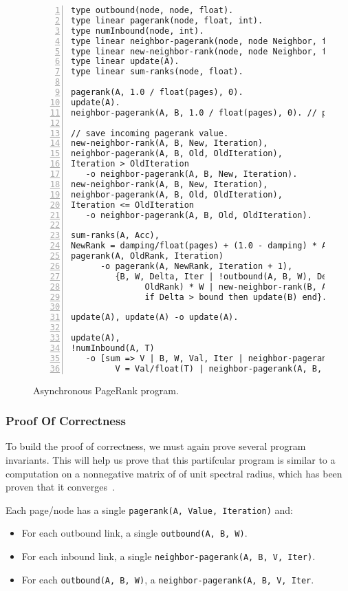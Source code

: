 \begin{figure}[h!]
\begin{Verbatim}[numbers=left,fontsize=\scriptsize]
type outbound(node, node, float).
type linear pagerank(node, float, int).
type numInbound(node, int).
type linear neighbor-pagerank(node, node Neighbor, float Rank, int Iteration).
type linear new-neighbor-rank(node, node Neighbor, float Rank, int Iteration).
type linear update(A).
type linear sum-ranks(node, float).

pagerank(A, 1.0 / float(pages), 0).
update(A).
neighbor-pagerank(A, B, 1.0 / float(pages), 0). // pagerank of B is ...

// save incoming pagerank value.
new-neighbor-rank(A, B, New, Iteration),
neighbor-pagerank(A, B, Old, OldIteration),
Iteration > OldIteration
   -o neighbor-pagerank(A, B, New, Iteration).
new-neighbor-rank(A, B, New, Iteration),
neighbor-pagerank(A, B, Old, OldIteration),
Iteration <= OldIteration
   -o neighbor-pagerank(A, B, Old, OldIteration).

sum-ranks(A, Acc),
NewRank = damping/float(pages) + (1.0 - damping) * Acc,
pagerank(A, OldRank, Iteration)
      -o pagerank(A, NewRank, Iteration + 1),
         {B, W, Delta, Iter | !outbound(A, B, W), Delta = fabs(NewRank -
               OldRank) * W | new-neighbor-rank(B, A, NewRank, Iteration + 1),
               if Delta > bound then update(B) end}.

update(A), update(A) -o update(A).

update(A),
!numInbound(A, T)
   -o [sum => V | B, W, Val, Iter | neighbor-pagerank(A, B, Val, Iter)
         V = Val/float(T) | neighbor-pagerank(A, B, Val, Iter) | sum-ranks(A, V)].
\end{Verbatim}
\caption{Asynchronous PageRank program.}
\label{language:code:async_pagerank}
\end{figure}

\subsubsection{Proof Of Correctness}

To build the proof of correctness, we must again prove several program
invariants. This will help us prove that this partifcular program is similar to
a computation on a nonnegative matrix of of unit spectral radius, which has been
proven that it converges~\cite{DBLP:journals/corr/abs-cs-0606047,
Lubachevsky:1986:CAA:4904.4801}.

\begin{invariant}
Each page/node has a single \texttt{pagerank(A, Value, Iteration)} and:
\begin{itemize}
   \item For each outbound link, a single \texttt{\bang outbound(A, B, W)}.
   \item For each inbound link, a single \texttt{neighbor-pagerank(A, B, V, Iter)}.
   \item For each \texttt{\bang outbound(A, B, W)}, a \texttt{neighbor-pagerank(A,
      B, V, Iter}.
\end{itemize}
\end{invariant}


